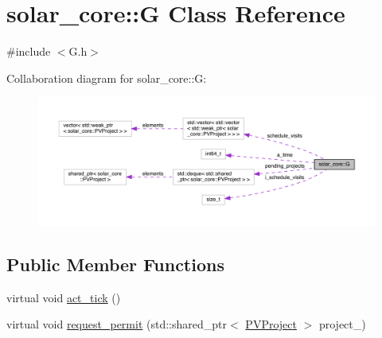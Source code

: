 \hypertarget{classsolar__core_1_1_g}{}\section{solar\+\_\+core\+:\+:G Class Reference}
\label{classsolar__core_1_1_g}


{\ttfamily \#include $<$G.\+h$>$}



Collaboration diagram for solar\+\_\+core\+:\+:G\+:
\nopagebreak
\begin{figure}[H]
\begin{center}
\leavevmode
\includegraphics[width=350pt]{classsolar__core_1_1_g__coll__graph}
\end{center}
\end{figure}
\subsection*{Public Member Functions}
{\bf }\par
\begin{DoxyCompactItemize}
\item 
virtual void \hyperlink{classsolar__core_1_1_g_ad3c9fb1da4db51b296c29a6b94b0f139}{act\+\_\+tick} ()
\end{DoxyCompactItemize}

{\bf }\par
\begin{DoxyCompactItemize}
\item 
virtual void \hyperlink{classsolar__core_1_1_g_a10289bd4ea370e0e994f69603e11fc6c}{request\+\_\+permit} (std\+::shared\+\_\+ptr$<$ \hyperlink{classsolar__core_1_1_p_v_project}{P\+V\+Project} $>$ project\+\_\+)
\end{DoxyCompactItemize}

